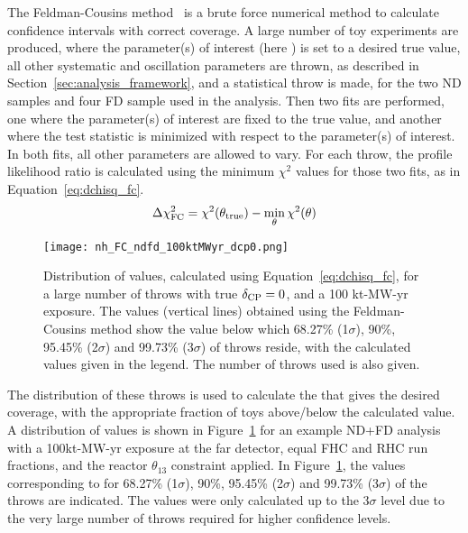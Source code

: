 The Feldman-Cousins method~\cite{Feldman:1997qc} is a brute force numerical method to calculate confidence intervals with correct coverage. A large number of toy experiments are produced, where the parameter(s) of interest (here \deltacp) is set to a desired true value, all other systematic and oscillation parameters are thrown, as described in Section~\ref{sec:analysis_framework}, and a statistical throw is made, for the two ND samples and four FD sample used in the analysis. Then two fits are performed, one where the parameter(s) of interest are fixed to the true value, and another where the test statistic is minimized with respect to the parameter(s) of interest. In both fits, all other parameters are allowed to vary. For each throw, the profile likelihood ratio \dchisqFC is calculated using the minimum $\chi^{2}$ values for those two fits, as in Equation~\ref{eq:dchisq_fc}.
\begin{equation}
  \Delta\chi^{2}_{\mathrm{FC}} = \chi^{2}(\theta_{\mathrm{true}}) - \min_{\theta}\chi^{2}(\theta)
  \label{eq:dchisq_fc}
\end{equation}
\begin{figure}[htbp]
  \centering
  \texttt{[image: nh\_FC\_ndfd\_100ktMWyr\_dcp0.png]}
  \caption{Distribution of \dchisqFC values, calculated using Equation~\ref{eq:dchisq_fc}, for a large number of throws with true $\delta_{\rm CP} = 0$, and a 100 kt-MW-yr exposure. The \dchisqcrit values (vertical lines) obtained using the Feldman-Cousins method show the \dchisqFC value below which 68.27\% (1$\sigma$), 90\%, 95.45\% (2$\sigma$) and 99.73\% (3$\sigma$) of throws reside, with the calculated values given in the legend. The number of throws used is also given.}
  \label{fig:fc_throws}
\end{figure}
The distribution of these throws is used to calculate the \dchisqcrit that gives the desired coverage, with the appropriate fraction of toys above/below the calculated value. A distribution of \dchisqFC values is shown in Figure~\ref{fig:fc_throws} for an example ND+FD analysis with a 100kt-MW-yr exposure at the far detector, equal FHC and RHC run fractions, and the reactor $\theta_{13}$ constraint applied. In Figure~\ref{fig:fc_throws}, the \dchisqcrit values corresponding to for 68.27\% (1$\sigma$), 90\%, 95.45\% (2$\sigma$) and 99.73\% (3$\sigma$) of the throws are indicated. The \dchisqcrit values were only calculated up to the 3$\sigma$ level due to the very large number of throws required for higher confidence levels.

